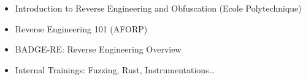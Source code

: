 \twocolumnsection
{
\vspace{1em}
\begin{itemize}
	\item Introduction to Reverse Engineering and Obfuscation (Ecole
		  Polytechnique)
	\item Reverse Engineering 101 (AFORP)
\end{itemize}
}
{
\vspace{1em}
\begin{itemize}
	\item BADGE-RE: Reverse Engineering Overview
	\item Internal Trainings: Fuzzing, Rust, Instrumentations\ldots
\end{itemize}
}

\vspace{1em}